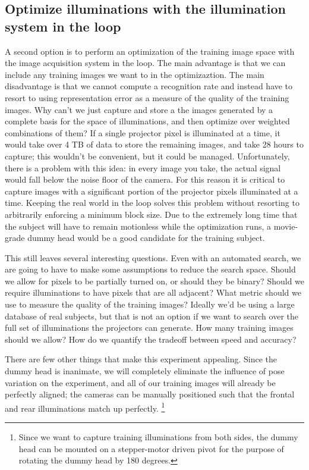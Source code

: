 \subsection{Optimize illuminations with the illumination system in the loop}
A second option is to perform an optimization of the training image space with
the image acquisition system in the loop.  The main advantage is that we can
include any training images we want to in the optimizaztion.  The main
disadvantage is that we cannot compute a recognition rate and instead have to
resort to using representation error as a measure of the quality of the
training images.  Why can't we just capture and store a the images generated by
a complete basis for the space of illuminations, and then optimize over
weighted combinations of them?  If a single projector pixel is illuminated at a
time, it would take over 4 TB of data to store the remaining images, and take
28 hours to capture; this wouldn't be convenient, but it could be managed.
Unfortunately, there is a problem with this idea:  in every image you take, the
actual signal would fall below the noise floor of the camera.  For this reason
it is critical to capture images with a significant portion of the projector
pixels illuminated at a time.  Keeping the real world in the loop solves this
problem without resorting to arbitrarily enforcing a minimum block size.  Due
to the extremely long time that the subject will have to remain motionless
while the optimization runs, a movie-grade dummy head would be a good candidate
for the training subject.  

This still leaves several interesting questions.  Even with an automated search, we are going to have to make some assumptions to reduce the search space.  Should we allow for pixels to be partially turned on, or should they be binary?  Should we require illuminations to have pixels that are all adjacent?  What metric should we use to measure the quality of the training images?  Ideally we'd be using a large database of real subjects, but that is not an option if we want to search over the full set of illuminations the projectors can generate.  How many training images should we allow?  How do we quantify the tradeoff between speed and accuracy?

There are few other things that make this experiment appealing.  Since the dummy head is inanimate, we will completely eliminate the influence of pose variation on the experiment, and all of our training images will already be perfectly aligned; the cameras can be manually positioned such that the frontal and rear illuminations match up perfectly. \footnote{Since we want to capture training illuminations from both sides, the dummy head can be mounted on a stepper-motor driven pivot for the purpose of rotating the dummy head by 180 degrees.  }


